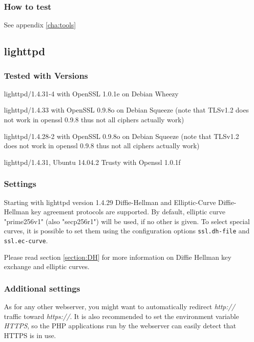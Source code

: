 \subsubsection{How to test}
See appendix \ref{cha:tools}


\subsection{lighttpd}

\subsubsection{Tested with Versions}
\begin{itemize*}
  \item lighttpd/1.4.31-4 with OpenSSL 1.0.1e on Debian Wheezy
  \item lighttpd/1.4.33 with OpenSSL 0.9.8o on Debian Squeeze (note that TLSv1.2 does not work in openssl 0.9.8 thus not all ciphers actually work)
  \item lighttpd/1.4.28-2 with OpenSSL 0.9.8o on Debian Squeeze (note that TLSv1.2 does not work in openssl 0.9.8 thus not all ciphers actually work)
  \item lighttpd/1.4.31, Ubuntu 14.04.2 Trusty with Openssl 1.0.1f
\end{itemize*}


\subsubsection{Settings}

Starting with lighttpd version 1.4.29 Diffie-Hellman and Elliptic-Curve Diffie-Hellman key agreement protocols are supported.
By default, elliptic curve "prime256v1" (also "secp256r1") will be used, if no other is given.
To select special curves, it is possible to set them using the configuration options \verb|ssl.dh-file| and \verb|ssl.ec-curve|.


Please read section \ref{section:DH} for more information on Diffie Hellman key exchange and elliptic curves.

\subsubsection{Additional settings}
As for any other webserver, you might want to automatically redirect \emph{http://}
traffic toward \emph{https://}. It is also recommended to set the environment variable
\emph{HTTPS}, so the PHP applications run by the webserver can easily detect
that HTTPS is in use.

